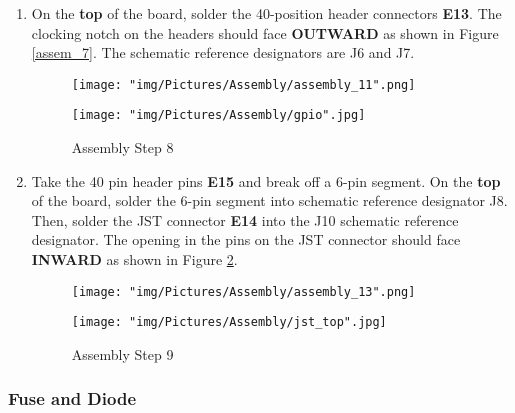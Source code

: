 \documentclass{article}
\begin{document}
\begin{enumerate}

\item On the \textbf{top} of the board, solder the 40-position header connectors \textbf{E13}. The clocking notch on the headers should face \textbf{OUTWARD} as shown in Figure \ref{assem_7}. The schematic reference designators are J6 and J7.

\begin{figure}[H]
  \centering
  \begin{minipage}[b]{0.45\textwidth}
    \texttt{[image: "img/Pictures/Assembly/assembly\_11".png]}
  \end{minipage}
  \hfill
  \begin{minipage}[b]{0.45\textwidth}
    \texttt{[image: "img/Pictures/Assembly/gpio".jpg]}
  \end{minipage}
  \caption{Assembly Step 8}
  \label{assem_8}
\end{figure}


\item Take the 40 pin header pins \textbf{E15} and break off a 6-pin segment. On the \textbf{top} of the board, solder the 6-pin segment into schematic reference designator J8. Then, solder the JST connector \textbf{E14} into the J10 schematic reference designator. The opening in the pins on the JST connector should face \textbf{INWARD} as shown in Figure \ref{assem_9}.

\begin{figure}[H]
  \centering
  \begin{minipage}[b]{0.45\textwidth}
    \texttt{[image: "img/Pictures/Assembly/assembly\_13".png]}
  \end{minipage}
  \hfill
  \begin{minipage}[b]{0.45\textwidth}
    \texttt{[image: "img/Pictures/Assembly/jst\_top".jpg]}
  \end{minipage}
  \caption{Assembly Step 9}
  \label{assem_9}
\end{figure}


\end{enumerate}

\subsubsection{Fuse and Diode}
\end{document}
